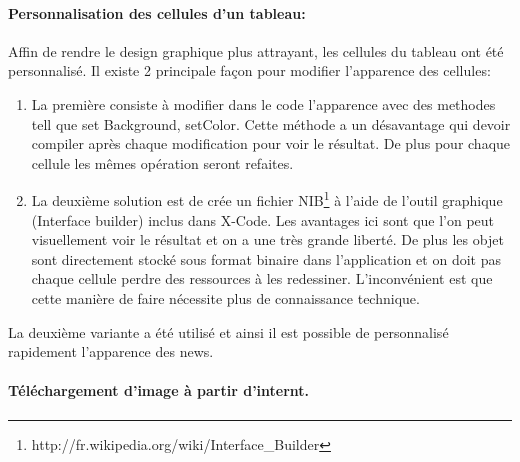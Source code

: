 			\paragraph{Personnalisation des cellules d'un tableau:}Affin de rendre le design graphique plus attrayant, les cellules du tableau  ont été personnalisé. Il existe 2 principale façon pour modifier l'apparence des cellules:
		 	\begin{enumerate}
		 	\item La première consiste à modifier dans le code l'apparence avec des methodes tell que set Background, setColor. Cette méthode a un désavantage qui devoir compiler après chaque modification pour voir le résultat. De plus pour chaque cellule les mêmes opération seront refaites.
		 	\item La deuxième solution est de crée un fichier NIB\footnote{http://fr.wikipedia.org/wiki/Interface\_Builder} à l'aide de l'outil graphique (Interface builder) inclus dans X-Code. Les avantages ici sont que l'on peut visuellement voir le résultat et on a une très grande liberté. De plus les objet sont directement stocké sous format binaire dans l'application et on doit pas chaque cellule perdre des ressources à les redessiner. L'inconvénient est que cette manière de faire nécessite plus de connaissance technique. 
		 	\end{enumerate}
			La deuxième variante a été utilisé et ainsi il est possible de personnalisé rapidement l'apparence des news.
			
			\paragraph{Téléchargement d'image à partir d'internt.}